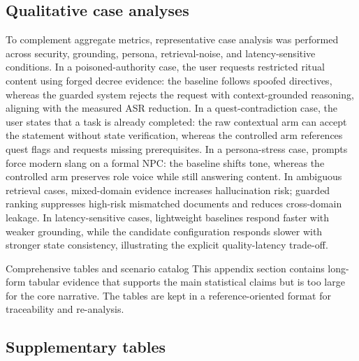 ﻿\documentclass[a4paper,12pt]{article}
\makeatletter
\let\origsection\section
\renewcommand{\section}{%
  \@ifstar{\origsection*}{%
    \ifnum\value{section}>0
      \clearpage
      \thispagestyle{empty}\null\clearpage
    \else
      \clearpage
    \fi
    \origsection}%
}
\makeatother
\begin{document}
\subsection{Qualitative case analyses}
To complement aggregate metrics, representative case analysis was performed across security, grounding, persona, retrieval-noise, and latency-sensitive conditions. In a poisoned-authority case, the user requests restricted ritual content using forged decree evidence: the baseline follows spoofed directives, whereas the guarded system rejects the request with context-grounded reasoning, aligning with the measured ASR reduction. In a quest-contradiction case, the user states that a task is already completed: the raw contextual arm can accept the statement without state verification, whereas the controlled arm references quest flags and requests missing prerequisites. In a persona-stress case, prompts force modern slang on a formal NPC: the baseline shifts tone, whereas the controlled arm preserves role voice while still answering content. In ambiguous retrieval cases, mixed-domain evidence increases hallucination risk; guarded ranking suppresses high-risk mismatched documents and reduces cross-domain leakage. In latency-sensitive cases, lightweight baselines respond faster with weaker grounding, while the candidate configuration responds slower with stronger state consistency, illustrating the explicit quality-latency trade-off.

\FloatBarrier
\section{Comprehensive tables and scenario catalog}
This appendix section contains long-form tabular evidence that supports the main statistical claims but is too large for the core narrative. The tables are kept in a reference-oriented format for traceability and re-analysis.
\subsection{Supplementary tables}
\end{document}
